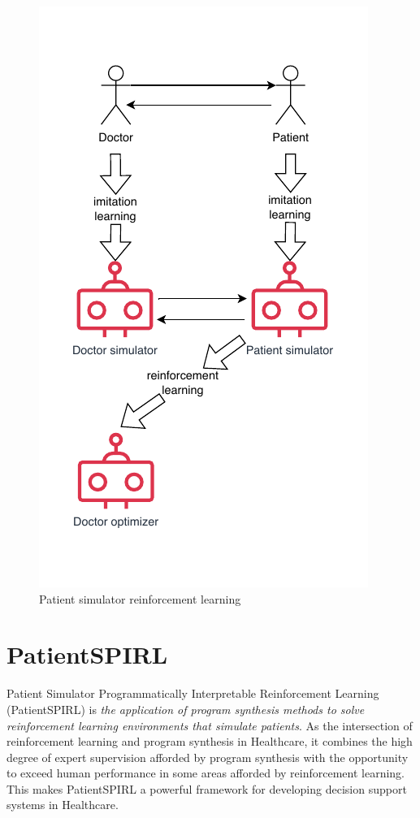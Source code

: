 \begin{figure}
  \centering
  \includegraphics[width=0.9\linewidth]{images/patientspirl.pdf}
  \caption{Patient simulator reinforcement learning}
  \label{fig:patientspirl}
\end{figure}

\newpage
\section{PatientSPIRL}
\label{sec:patient-spirl}

\begin{highlight}
Patient Simulator Programmatically Interpretable Reinforcement Learning (PatientSPIRL) is \emph{the application of program synthesis methods to solve reinforcement learning environments that simulate patients}.
As the intersection of reinforcement learning and program synthesis in Healthcare, it combines the high degree of expert supervision afforded by program synthesis with the opportunity to exceed human performance in some areas afforded by reinforcement learning.
This makes PatientSPIRL a powerful framework for developing decision support systems in Healthcare.
\end{highlight}